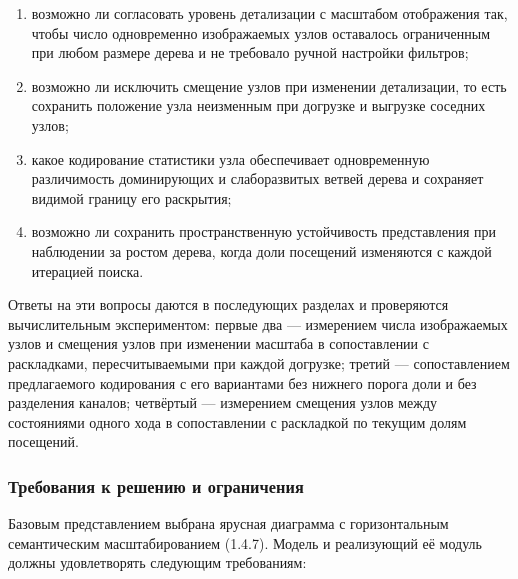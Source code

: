 \begin{enumerate}

  \item возможно ли согласовать уровень детализации с масштабом отображения так, чтобы число одновременно изображаемых узлов оставалось ограниченным при любом размере дерева и не требовало ручной настройки фильтров;

  \item возможно ли исключить смещение узлов при изменении детализации, то есть сохранить положение узла неизменным при догрузке и выгрузке соседних узлов;

  \item какое кодирование статистики узла обеспечивает одновременную различимость доминирующих и слаборазвитых ветвей дерева и сохраняет видимой границу его раскрытия;

  \item возможно ли сохранить пространственную устойчивость представления при наблюдении за ростом дерева, когда доли посещений изменяются с каждой итерацией поиска.

\end{enumerate}

Ответы на эти вопросы даются в последующих разделах и проверяются вычислительным экспериментом: первые два — измерением числа изображаемых узлов и смещения узлов при изменении масштаба в сопоставлении с раскладками, пересчитываемыми при каждой догрузке; третий — сопоставлением предлагаемого кодирования с его вариантами без нижнего порога доли и без разделения каналов; четвёртый — измерением смещения узлов между состояниями одного хода в сопоставлении с раскладкой по текущим долям посещений.

\subsubsection{Требования к решению и ограничения}

Базовым представлением выбрана ярусная диаграмма с горизонтальным семантическим масштабированием (1.4.7). Модель и реализующий её модуль должны удовлетворять следующим требованиям:

